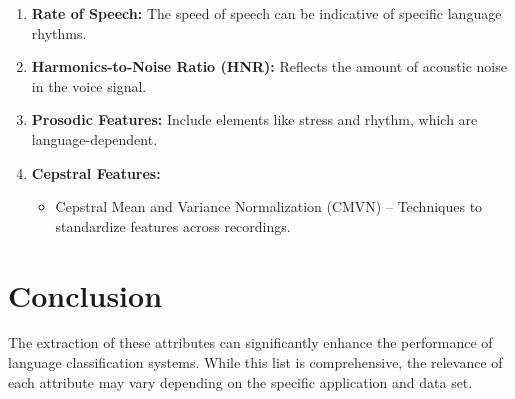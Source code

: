 \documentclass{article}
\begin{document}
\begin{enumerate}[label=\arabic*.]
    \item \textbf{Rate of Speech:} The speed of speech can be indicative of specific language rhythms.
    
    \item \textbf{Harmonics-to-Noise Ratio (HNR):} Reflects the amount of acoustic noise in the voice signal.
    
    \item \textbf{Prosodic Features:} Include elements like stress and rhythm, which are language-dependent.
    
    \item \textbf{Cepstral Features:}
    \begin{itemize}
        \item Cepstral Mean and Variance Normalization (CMVN) -- Techniques to standardize features across recordings.
    \end{itemize}
\end{enumerate}

\section{Conclusion}
The extraction of these attributes can significantly enhance the performance of language classification systems. While this list is comprehensive, the relevance of each attribute may vary depending on the specific application and data set. 
\end{document}
